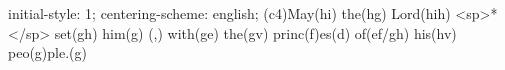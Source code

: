 initial-style: 1;
centering-scheme: english;
(c4)May(hi) the(hg) Lord(hih) <sp>*</sp> set(gh) him(g) (,) with(ge) the(gv) princ(f)es(d) of(ef/gh) his(hv) peo(g)ple.(g)
